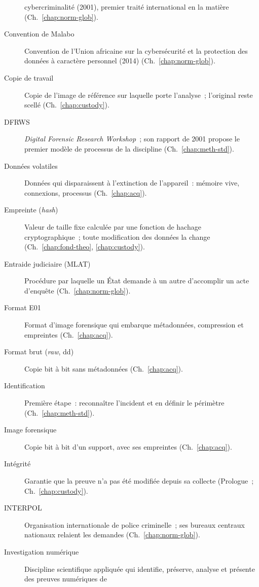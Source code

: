 \begin{description}
          cybercriminalité (2001), premier traité international en la matière
          (Ch.~\ref{chap:norm-glob}).
    \item[Convention de Malabo] Convention de l'Union africaine sur la
          cybersécurité et la protection des données à caractère personnel
          (2014) (Ch.~\ref{chap:norm-glob}).
    \item[Copie de travail] Copie de l'image de référence sur laquelle porte
          l'analyse~; l'original reste scellé (Ch.~\ref{chap:custody}).
    \item[DFRWS] \textit{Digital Forensic Research Workshop}~; son rapport de
          2001 propose le premier modèle de processus de la discipline
          (Ch.~\ref{chap:meth-std}).
    \item[Données volatiles] Données qui disparaissent à l'extinction de
          l'appareil~: mémoire vive, connexions, processus (Ch.~\ref{chap:acq}).
    \item[Empreinte (\textit{hash})] Valeur de taille fixe calculée par une
          fonction de hachage cryptographique~; toute modification des
          données la change (Ch.~\ref{chap:fond-theo}, \ref{chap:custody}).
    \item[Entraide judiciaire (MLAT)] Procédure par laquelle un État demande à
          un autre d'accomplir un acte d'enquête (Ch.~\ref{chap:norm-glob}).
    \item[Format E01] Format d'image forensique qui embarque métadonnées,
          compression et empreintes (Ch.~\ref{chap:acq}).
    \item[Format brut (\textit{raw}, dd)] Copie bit à bit sans métadonnées
          (Ch.~\ref{chap:acq}).
    \item[Identification] Première étape~: reconnaître l'incident et en
          définir le périmètre (Ch.~\ref{chap:meth-std}).
    \item[Image forensique] Copie bit à bit d'un support, avec ses empreintes
          (Ch.~\ref{chap:acq}).
    \item[Intégrité] Garantie que la preuve n'a pas été modifiée depuis sa
          collecte (Prologue~; Ch.~\ref{chap:custody}).
    \item[INTERPOL] Organisation internationale de police criminelle~; ses
          bureaux centraux nationaux relaient les demandes
          (Ch.~\ref{chap:norm-glob}).
    \item[Investigation numérique] Discipline scientifique appliquée qui
          identifie, préserve, analyse et présente des preuves numériques de

\end{description}
